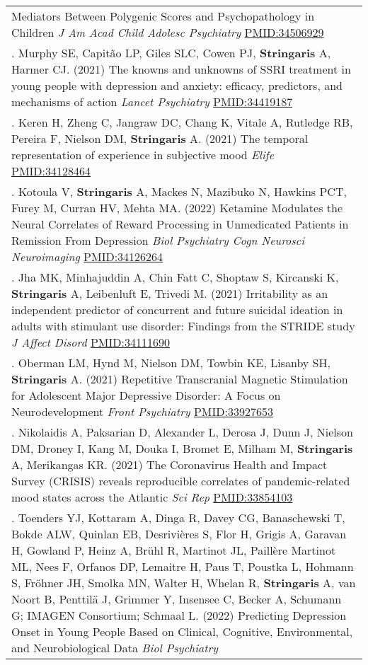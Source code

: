 \documentclass[
]{article}
\begin{document}
\begin{longtable}[]{@{}
  >{\raggedright\arraybackslash}p{}@{}}
Mediators Between Polygenic Scores and Psychopathology in Children
\emph{J Am Acad Child Adolesc Psychiatry} \url{PMID:34506929} \\
46. Murphy SE, Capitão LP, Giles SLC, Cowen PJ, \textbf{Stringaris} A,
Harmer CJ. (2021) The knowns and unknowns of SSRI treatment in young
people with depression and anxiety: efficacy, predictors, and mechanisms
of action \emph{Lancet Psychiatry} \url{PMID:34419187} \\
47. Keren H, Zheng C, Jangraw DC, Chang K, Vitale A, Rutledge RB,
Pereira F, Nielson DM, \textbf{Stringaris} A. (2021) The temporal
representation of experience in subjective mood \emph{Elife}
\url{PMID:34128464} \\
48. Kotoula V, \textbf{Stringaris} A, Mackes N, Mazibuko N, Hawkins PCT,
Furey M, Curran HV, Mehta MA. (2022) Ketamine Modulates the Neural
Correlates of Reward Processing in Unmedicated Patients in Remission
From Depression \emph{Biol Psychiatry Cogn Neurosci Neuroimaging}
\url{PMID:34126264} \\
49. Jha MK, Minhajuddin A, Chin Fatt C, Shoptaw S, Kircanski K,
\textbf{Stringaris} A, Leibenluft E, Trivedi M. (2021) Irritability as
an independent predictor of concurrent and future suicidal ideation in
adults with stimulant use disorder: Findings from the STRIDE study
\emph{J Affect Disord} \url{PMID:34111690} \\
50. Oberman LM, Hynd M, Nielson DM, Towbin KE, Lisanby SH,
\textbf{Stringaris} A. (2021) Repetitive Transcranial Magnetic
Stimulation for Adolescent Major Depressive Disorder: A Focus on
Neurodevelopment \emph{Front Psychiatry} \url{PMID:33927653} \\
51. Nikolaidis A, Paksarian D, Alexander L, Derosa J, Dunn J, Nielson
DM, Droney I, Kang M, Douka I, Bromet E, Milham M, \textbf{Stringaris}
A, Merikangas KR. (2021) The Coronavirus Health and Impact Survey
(CRISIS) reveals reproducible correlates of pandemic-related mood states
across the Atlantic \emph{Sci Rep} \url{PMID:33854103} \\
52. Toenders YJ, Kottaram A, Dinga R, Davey CG, Banaschewski T, Bokde
ALW, Quinlan EB, Desrivières S, Flor H, Grigis A, Garavan H, Gowland P,
Heinz A, Brühl R, Martinot JL, Paillère Martinot ML, Nees F, Orfanos DP,
Lemaitre H, Paus T, Poustka L, Hohmann S, Fröhner JH, Smolka MN, Walter
H, Whelan R, \textbf{Stringaris} A, van Noort B, Penttilä J, Grimmer Y,
Insensee C, Becker A, Schumann G; IMAGEN Consortium; Schmaal L. (2022)
Predicting Depression Onset in Young People Based on Clinical,
Cognitive, Environmental, and Neurobiological Data \emph{Biol Psychiatry
}
\end{longtable}
\end{document}
